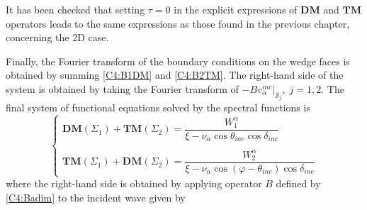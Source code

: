 It has been checked that setting $\tau=0$ in the explicit expressions of $\mathbf{DM}$ and $\mathbf{TM}$ operators leads to the same expressions as those found in the previous chapter, concerning the 2D case.

Finally, the Fourier transform of the boundary conditions on the wedge faces is obtained by summing \eqref{C4:B1DM} and \eqref{C4:B2TM}. The right-hand side of the system is obtained by taking the Fourier transform of $-Bv_{\alpha}^{inc}|_{\mathcal{S}_j}, \; j=1,2$. The final system of functional equations solved by the spectral functions is 
\begin{equation}
\left\{
\begin{matrix}
\textbf{DM}(\Sigma_1)+\textbf{TM}(\Sigma_2)=\dfrac{W_1^{\alpha}}{\xi-\nu_{\alpha} \cos \theta_{inc}\cos\delta_{inc}} 
\\
~\\
\textbf{TM}(\Sigma_1)+\textbf{DM}(\Sigma_2)=\dfrac{W_2^{\alpha}}{\xi-\nu_{\alpha}\cos(\varphi-\theta_{inc})\cos\delta_{inc}}
\end{matrix}
\right.
\label{C4:equationsintegrales}
\end{equation}
where the right-hand side is obtained by applying operator $B$ defined by \eqref{C4:Badim} to the incident wave given by 
